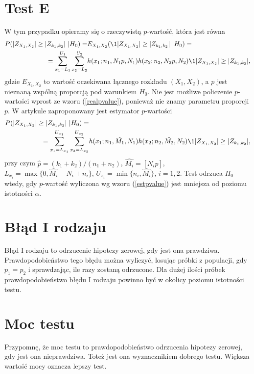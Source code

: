\section{Test E}
W tym przypadku opieramy się o rzeczywistą $p$-wartość, która jest równa
\begin{equation}
\label{realpvalue}
\begin{split}
P(|Z_{X_1,X_2}|\geq|Z_{k_1,k_2}|\ |H_0) =& E_{X_1,X_2}(\1{|Z_{X_1,X_2}|\geq|Z_{k_1,k_2}|}\ |H_0) = \\
= \sum_{x_1=L_1}^{U_1}\sum_{x_2=L_2}^{U_2}& h(x_1;n_1,N_1p,N_1)h(x_2;n_2,N_2p,N_2)\1{|Z_{X_1,X_2}|\geq|Z_{k_1,k_2}|},
\end{split}
\end{equation}
gdzie $E_{X_1,X_2}$ to wartość oczekiwana łącznego rozkładu $(X_1,X_2)$, a $p$ jest nieznaną wspólną proporcją pod warunkiem $H_0$. Nie jest możliwe policzenie $p$-wartości wprost ze wzoru (\ref{realpvalue}), ponieważ nie znamy parametru proporcji $p$. W artykule \cite{K.Krishnamoorthy2002} zaproponowany jest estymator $p$-wartości
\begin{equation}
\label{estpvalue}
\begin{split}
P(|Z_{X_1,X_2}|\geq|Z_{k_1,k_2}|\ |H_0) =& \\ =\sum_{x_1=L_{x_1}}^{U_{x_1}}\sum_{x_2=L_{x_2}}^{U_{x_2}}& h(x_1;n_1,\hat{M_1},N_1)h(x_2;n_2,\hat{M_2},N_2)\1{|Z_{X_1,X_2}|\geq|Z_{k_1,k_2}|},
\end{split}
\end{equation}
przy czym $\hat{p}=(k_1+k_2)/(n_1+n_2)$, $\hat{M_i}=[N_i\hat{p}]$, $L_{x_i}=\max\{0,\hat{M_i}-N_i+n_i\}$, $U_{x_i}=\min\{n_i,\hat{M_i}\}$, $i=1,2$. Test odrzuca $H_0$ wtedy, gdy $p$-wartość wyliczona wg wzoru (\ref{estpvalue}) jest mniejsza od poziomu istotności $\alpha$.

\section{Błąd I rodzaju}
Błąd I rodzaju to odrzucenie hipotezy zerowej, gdy jest ona prawdziwa. Prawdopodobieństwo tego błędu można wyliczyć, losując próbki z populacji, gdy $p_1=p_2$ i sprawdzając, ile razy zostaną odrzucone. Dla dużej ilości próbek prawdopodobieństwo błędu I rodzaju powinno być w okolicy poziomu istotności testu.

\section{Moc testu}
Przypomnę, że moc testu to prawdopodobieństwo odrzucenia hipotezy zerowej, gdy jest ona nieprawdziwa. Toteż jest ona wyznacznikiem dobrego testu. Większa wartość mocy oznacza lepszy test.

